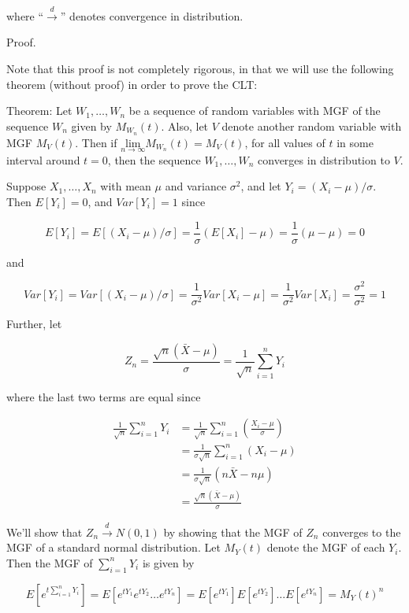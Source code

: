 \documentclass[
  letterpaper,
  DIV=11,
  numbers=noendperiod]{scrreprt}
\begin{document}
where ``\(\overset{d}{\to}\)'' denotes convergence in distribution.

Proof.

Note that this proof is not completely rigorous, in that we will use the
following theorem (without proof) in order to prove the CLT:

Theorem: Let \(W_1, \dots, W_n\) be a sequence of random variables with
MGF of the sequence \(W_n\) given by \(M_{W_n}(t)\). Also, let \(V\)
denote another random variable with MGF \(M_V(t)\). Then if
\(\underset{n \to \infty}{\text{lim}} M_{W_n}(t) = M_V(t)\), for all
values of \(t\) in some interval around \(t = 0\), then the sequence
\(W_1, \dots, W_n\) converges in distribution to \(V\).

Suppose \(X_1, \dots, X_n\) with mean \(\mu\) and variance \(\sigma^2\),
and let \(Y_i = (X_i - \mu)/\sigma\). Then \(E[Y_i] = 0\), and
\(Var[Y_i] = 1\) since

\[
E[Y_i] = E \left[ (X_i - \mu)/\sigma\right] = \frac{1}{\sigma} (E[X_i] - \mu) = \frac{1}{\sigma} (\mu - \mu) = 0
\]

and

\[
Var[Y_i] = Var\left[ (X_i - \mu)/\sigma\right] = \frac{1}{\sigma^2} Var[X_i - \mu] = \frac{1}{\sigma^2} Var[X_i] = \frac{\sigma^2}{\sigma^2} = 1
\]

Further, let

\[
Z_n = \frac{\sqrt{n}(\bar{X} - \mu)}{\sigma} = \frac{1}{\sqrt{n}} \sum_{i = 1}^n Y_i
\]

where the last two terms are equal since

\begin{align*}
    \frac{1}{\sqrt{n}} \sum_{i = 1}^n Y_i & = \frac{1}{\sqrt{n}} \sum_{i = 1}^n \left( \frac{X_i - \mu}{\sigma}\right)\\
    & = \frac{1}{\sigma\sqrt{n}} \sum_{i = 1}^n (X_i - \mu) \\
    & = \frac{1}{\sigma\sqrt{n}}  (n\bar{X} - n\mu) \\
    & = \frac{\sqrt{n}(\bar{X} - \mu)}{\sigma}
\end{align*}

We'll show that \(Z_n \overset{d}{\to} N(0,1)\) by showing that the MGF
of \(Z_n\) converges to the MGF of a standard normal distribution. Let
\(M_Y(t)\) denote the MGF of each \(Y_i\). Then the MGF of
\(\sum_{i = 1}^n Y_i\) is given by

\[
E[e^{t\sum_{i = 1}^n Y_i}] = E[e^{tY_1}e^{tY_2} \dots e^{tY_n}] = E[e^{tY_1}]E[e^{tY_2}] \dots E[e^{tY_n}] = M_Y(t)^n
\]
\end{document}
